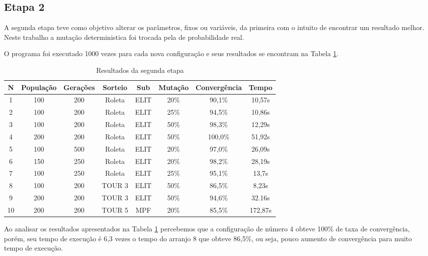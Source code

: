 \documentclass[a4paper, 12pt]{article}
\begin{document}
  \subsection{Etapa 2}
  A segunda etapa teve como objetivo alterar os parâmetros, fixos ou variáveis,
  da primeira com o intuito de encontrar um resultado melhor. Neste trabalho
  a mutação deterministica foi trocada pela de probabilidade real.

  O programa foi executado 1000 vezes para cada nova configuração
  e seus resultados se encontram na Tabela \ref{tab:etapa2}.

  \begin{table}[h]
    \centering
    \begin{tabular}{|c|c|c|c|c|c|c|c|}
      \hline
      N & População & Gerações & Sorteio & Sub & Mutação & Convergência & Tempo  \\
      \hline
      1 & 100 & 200 & Roleta & ELIT & 20\% & 90,1\% & 10,57s \\
      \hline
      2 & 100 & 200 & Roleta & ELIT & 25\% & 94,5\% & 10,86s \\
      \hline
      3 & 100 & 200 & Roleta & ELIT & 50\% & 98,3\% & 12,29s \\
      \hline
      4 & 200 & 200 & Roleta & ELIT & 50\% & 100,0\% & 51,92s \\
      \hline
      5 & 100 & 500 & Roleta & ELIT & 20\% & 97,0\% & 26,09s \\
      \hline
      6 & 150 & 250 & Roleta & ELIT & 20\% & 98,2\% & 28,19s \\
      \hline
      7 & 100 & 250 & Roleta & ELIT & 25\% & 95,1\% & 13,7s \\
      \hline
      8 & 100 & 200 & TOUR 3 & ELIT & 50\% & 86,5\% & 8,23s \\
      \hline
      9 & 200 & 200 & TOUR 3 & ELIT & 50\% & 94,6\% & 32.16s \\
      \hline
      10 & 200 & 200 & TOUR 5 & MPF & 20\% & 85,5\% & 172,87s \\
      \hline
    \end{tabular}
    \caption{Resultados da segunda etapa}
    \label{tab:etapa2}
  \end{table}

  Ao analisar os resultados apresentados na Tabela \ref{tab:etapa2} percebemos
  que a configuração de número 4 obteve 100\% de taxa de convergência, porém,
  seu tempo de execução é 6,3 vezes o tempo do arranjo 8 que obteve 86,5\%, ou seja,
  pouco aumento de convergência para muito tempo de execução.
\end{document}
